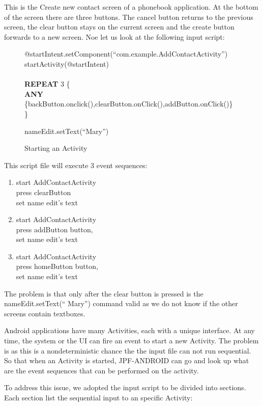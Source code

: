 \documentclass{acm_proc_article-sp}
\begin{document}
This is the Create new contact screen of a phonebook application. At the bottom of the screen there are three buttons. The cancel button
returns to the previous screen, the clear button stays on the current screen and the create button forwards to a new screen. Noe  let us
look at the following input script:

\begin{figure}
{\small
{\sf 
@startIntent.setComponent(``com.example.AddContactActivity'')\\
startActivity(@startIntent)\\
\\
\textbf{REPEAT} 3 \{\\
\textbf{ANY} \{backButton.onclick(),clearButton.onClick(),addButton.onClick()\}\\
\}

nameEdit.setText(``Mary'')
}
}
\caption{Starting an Activity}
\end{figure}

This script file will execute 3 event sequences:
\begin{enumerate}
 \item start AddContactActivity\\
press clearButton\\
set name edit's text
 \item start AddContactActivity\\ 
 press addButton button, \\
 set name edit's text
 \item start AddContactActivity\\
 press homeButton button, \\
 set name edit's text
\end{enumerate}

The problem is that only after the clear button is pressed is the nameEdit.setText(`` Mary'') command valid as we do not know if the other
screens contain textboxes.

Android applications have many Activities, each with a unique interface. At any time, the system or the UI can fire an event to start a new
Activity. The problem is as this is a nondeterministic chance the the input file can not run sequential. So that when an Activity is
started, JPF-ANDROID can go and look up what are the event sequences that can be performed on the activity.


To address this issue, we adopted the input script to be divided into sections. Each section list the sequential input to an specific
Activity:
\end{document}

